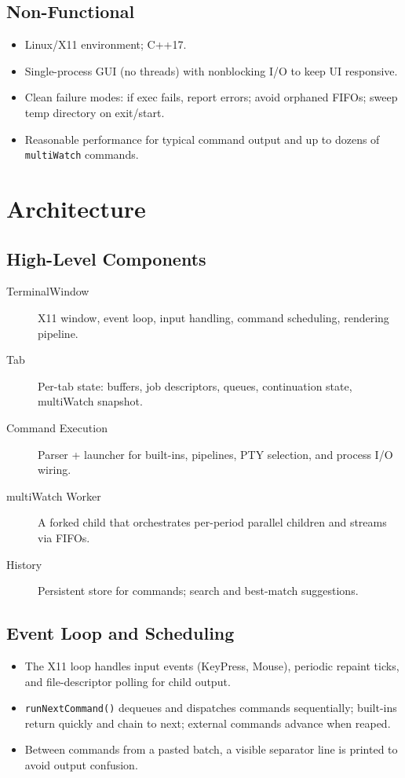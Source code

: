 \documentclass[11pt,a4paper]{article}
\begin{document}
\subsection{Non-Functional}
\begin{itemize}[leftmargin=*]
  \item Linux/X11 environment; C++17.
  \item Single-process GUI (no threads) with nonblocking I/O to keep UI responsive.
  \item Clean failure modes: if exec fails, report errors; avoid orphaned FIFOs; sweep temp directory on exit/start.
  \item Reasonable performance for typical command output and up to dozens of \texttt{multiWatch} commands.
\end{itemize}

\section{Architecture}
\subsection{High-Level Components}
\begin{description}
  \item[TerminalWindow] X11 window, event loop, input handling, command scheduling, rendering pipeline.
  \item[Tab] Per-tab state: buffers, job descriptors, queues, continuation state, multiWatch snapshot.
  \item[Command Execution] Parser + launcher for built-ins, pipelines, PTY selection, and process I/O wiring.
  \item[multiWatch Worker] A forked child that orchestrates per-period parallel children and streams via FIFOs.
  \item[History] Persistent store for commands; search and best-match suggestions.
\end{description}

\subsection{Event Loop and Scheduling}
\begin{itemize}[leftmargin=*]
  \item The X11 loop handles input events (KeyPress, Mouse), periodic repaint ticks, and file-descriptor polling for child output.
  \item \texttt{runNextCommand()} dequeues and dispatches commands sequentially; built-ins return quickly and chain to next; external commands advance when reaped.
  \item Between commands from a pasted batch, a visible separator line is printed to avoid output confusion.
\end{itemize}
\end{document}
